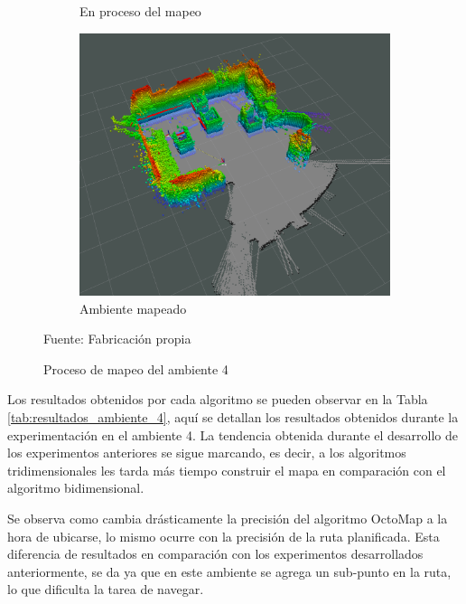 \begin{figure}[H]
\begin{subfigure}[b]{0.30\textwidth}
    \caption{En proceso del mapeo}
    \label{fig:ambiente_4_2}
    \end{subfigure}
    \begin{subfigure}[b]{0.30\textwidth}
    \includegraphics[width=\textwidth, height=\textwidth]{figures/05experimentacion/ambiente_4/r03_03.png}
    \caption{Ambiente mapeado}
    \label{fig:ambiente_4_3}
    \end{subfigure}
    \caption{Proceso de mapeo del ambiente 4}
    Fuente: Fabricación propia
    \label{fig:ambiente_4}
\end{figure} 

Los resultados obtenidos por cada algoritmo se pueden observar en la Tabla \ref{tab:resultados_ambiente_4}, aquí se detallan los resultados obtenidos durante la experimentación en el ambiente 4. La tendencia obtenida durante el desarrollo de los experimentos anteriores se sigue marcando, es decir, a los algoritmos tridimensionales les tarda más tiempo construir el mapa en comparación con el algoritmo bidimensional.

Se observa como cambia drásticamente la precisión del algoritmo OctoMap a la hora de ubicarse, lo mismo ocurre con la precisión de la ruta planificada. Esta diferencia de resultados en comparación con los experimentos desarrollados anteriormente, se da ya que en este ambiente se agrega un sub-punto en la ruta, lo que dificulta la tarea de navegar.


